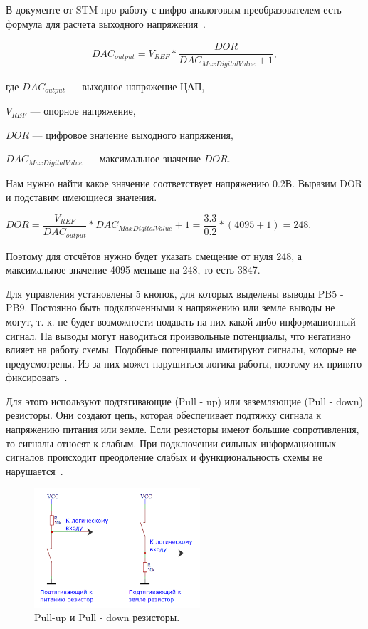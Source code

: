 	В документе от STM про работу с цифро-аналоговым преобразователем есть формула для расчета выходного напряжения~\cite{an3126}.
	
	\begin{gather}
	DAC_{output} = V_{REF}*\dfrac{DOR}{DAC_{MaxDigitalValue} + 1},
	\end{gather}
	
	где $DAC_{output}$ --- выходное напряжение ЦАП,
	
	$V_{REF}$ --- опорное напряжение,
	
	$DOR$ --- цифровое значение выходного напряжения,
	
	$DAC_{MaxDigitalValue}$ --- максимальное значение $DOR$.
	
	Нам нужно найти какое значение соответствует напряжению 0.2В. Выразим DOR и подставим имеющиеся значения.
	
	\begin{center}
	$DOR = \dfrac{V_{REF}}{DAC_{output}}*DAC_{MaxDigitalValue} + 1 = \dfrac{3.3}{0.2}*(4095+1) = 248.$
	\end{center}
	
	Поэтому для отсчётов нужно будет указать смещение от нуля 248, а максимальное значение 4095 меньше на 248, то есть 3847. 
	
	Для управления установлены 5 кнопок, для которых выделены выводы PB5 - PB9. Постоянно быть подключенными к напряжению или земле выводы не могут, т. к. не будет возможности подавать на них какой-либо информационный сигнал. На выводы могут наводиться произвольные потенциалы, что негативно влияет на работу схемы. Подобные потенциалы имитируют сигналы, которые не предусмотрены. Из-за них может нарушиться логика работы, поэтому их принято фиксировать~\cite{schemat}. 
	
	Для этого используют подтягивающие (Pull - up) или заземляющие (Pull - down) резисторы. Они создают цепь, которая обеспечивает подтяжку сигнала к напряжению питания или земле. Если резисторы имеют большие сопротивления, то сигналы относят к слабым. При подключении сильных информационных сигналов происходит преодоление слабых и функциональность схемы не нарушается~\cite{butres}.
	
	\begin{figure}[H]
    \centering
    \includegraphics[width=0.55\textwidth]{../image/res.png}
    \caption{Pull-up и Pull - down резисторы.}
	\end{figure}
	
